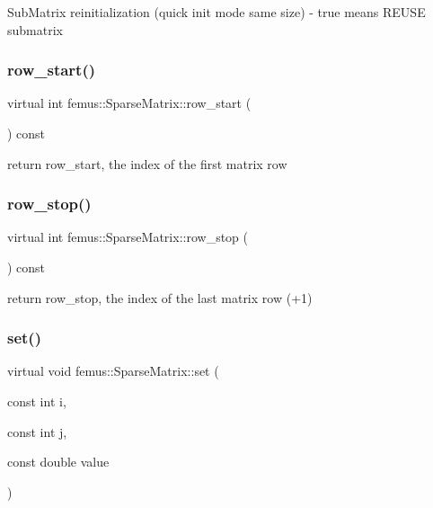Sub\+Matrix reinitialization (quick init mode same size) -\/ true means R\+E\+U\+SE submatrix \mbox{\label{classfemus_1_1_sparse_matrix_a2a5351deb9332ad119f4bcf9f376eed3}} 
\subsubsection{\texorpdfstring{row\+\_\+start()}{row\_start()}}
{\footnotesize\ttfamily virtual int femus\+::\+Sparse\+Matrix\+::row\+\_\+start (\begin{DoxyParamCaption}{ }\end{DoxyParamCaption}) const\hspace{0.3cm}{\ttfamily [pure virtual]}}

return row\+\_\+start, the index of the first matrix row \mbox{\label{classfemus_1_1_sparse_matrix_a178d3324c3cedd0b39a6d5931bfd6da1}} 
\subsubsection{\texorpdfstring{row\+\_\+stop()}{row\_stop()}}
{\footnotesize\ttfamily virtual int femus\+::\+Sparse\+Matrix\+::row\+\_\+stop (\begin{DoxyParamCaption}{ }\end{DoxyParamCaption}) const\hspace{0.3cm}{\ttfamily [pure virtual]}}

return row\+\_\+stop, the index of the last matrix row (+1) \mbox{\label{classfemus_1_1_sparse_matrix_a63319c488a146297062c48daef79e1d1}} 
\subsubsection{\texorpdfstring{set()}{set()}}
{\footnotesize\ttfamily virtual void femus\+::\+Sparse\+Matrix\+::set (\begin{DoxyParamCaption}\item[{const int}]{i,  }\item[{const int}]{j,  }\item[{const double}]{value }\end{DoxyParamCaption})\hspace{0.3cm}{\ttfamily [pure virtual]}}

